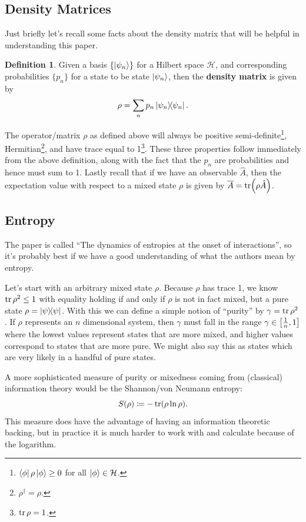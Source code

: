 \documentclass[11pt,english]{article}
\theoremstyle{definition}
\newtheorem{definition}{Definition}[section]
\begin{document}
\subsection{Density Matrices}\label{sec:density-matrices}
Just briefly let's recall some facts about the density matrix that will be helpful in understanding this paper.
\begin{definition}
	Given a basis $\{\ket{\psi_n}\}$ for a Hilbert space $\mathcal{H}$, and corresponding probabilities $\{p_n\}$ for a state to be state $\ket{\psi_n}$, then the \textbf{density matrix} is given by
	\begin{equation*}
		\rho = \sum_n p_n\ketbra{\psi_n}.
	\end{equation*}
\end{definition}
The operator/matrix $\rho$ as defined above will always be positive semi-definite\footnote{$\bra{\phi}\rho\ket{\phi}\geq 0$ for all $\ket{\phi}\in\mathcal{H}$.}, Hermitian\footnote{$\rho^\dagger = \rho$.}, and have trace equal to 1\footnote{$\tr\rho = 1$.}. These three properties follow immediately from the above definition, along with the fact that the $p_n$ are probabilities and hence must sum to 1. Lastly recall that if we have an observable $\hat{A}$, then the expectation value with respect to a mixed state $\rho$ is given by $\overline{A} = \tr(\rho\hat{A})$.

\subsection{Entropy}
The paper is called ``The dynamics of entropies at the onset of interactions'', so it's probably best if we have a good understanding of what the authors mean by entropy.

Let's start with an arbitrary mixed state $\rho$. Because $\rho$ has trace 1, we know $\tr\rho^2\leq 1$ with equality holding if and only if $\rho$ is not in fact mixed, but a pure state $\rho = \ketbra{\psi}$. With this we can define a simple notion of ``purity'' by $\gamma = \tr\rho^2$. If $\rho$ represents an $n$ dimensional system, then $\gamma$ must fall in the range $\gamma\in\qty[\frac{1}{n}, 1]$ where the lowest values represent states that are more mixed, and higher values correspond to states that are more pure. We might also say this as states which are very likely in a handful of pure states.

A more sophisticated measure of purity or mixedness coming from (classical) information theory would be the Shannon/von Neumann entropy:
\begin{equation*}
	S(\rho)\coloneqq -\tr(\rho\ln\rho).
\end{equation*}
This measure does have the advantage of having an information theoretic backing, but in practice it is much harder to work with and calculate because of the logarithm.
\end{document}
